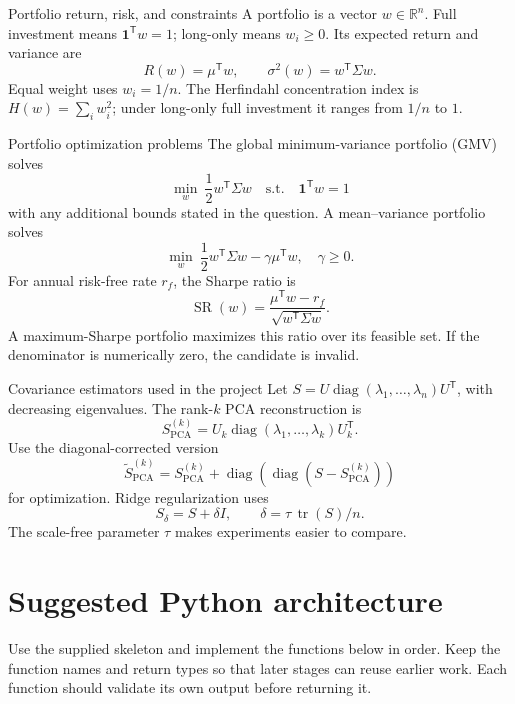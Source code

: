 \documentclass[10pt]{article}
\newcommand{\R}{\mathbb{R}}
\newcommand{\trans}{^{\mathsf T}}
\newcommand{\diag}{\operatorname{diag}}
\begin{document}
\begin{definitionbox}{Portfolio return, risk, and constraints}
A portfolio is a vector $w\in\R^n$. Full investment means
$\mathbf1\trans w=1$; long-only means $w_i\geq0$. Its expected return and
variance are
\[
R(w)=\mu\trans w,\qquad \sigma^2(w)=w\trans\Sigma w.
\]
Equal weight uses $w_i=1/n$. The Herfindahl concentration index is
$H(w)=\sum_iw_i^2$; under long-only full investment it ranges from $1/n$ to
$1$.
\end{definitionbox}

\begin{definitionbox}{Portfolio optimization problems}
The global minimum-variance portfolio (GMV) solves
\[
\min_w\ \frac12w\trans\Sigma w
\quad\text{s.t.}\quad \mathbf1\trans w=1
\]
with any additional bounds stated in the question. A mean--variance portfolio
solves
\[
\min_w\ \frac12w\trans\Sigma w-\gamma\mu\trans w,
\quad \gamma\geq0.
\]
For annual risk-free rate $r_f$, the Sharpe ratio is
\[
\operatorname{SR}(w)=
\frac{\mu\trans w-r_f}{\sqrt{w\trans\Sigma w}}.
\]
A maximum-Sharpe portfolio maximizes this ratio over its feasible set. If the
denominator is numerically zero, the candidate is invalid.
\end{definitionbox}

\begin{definitionbox}{Covariance estimators used in the project}
Let $S=U\diag(\lambda_1,\ldots,\lambda_n)U\trans$, with decreasing
eigenvalues. The rank-$k$ PCA reconstruction is
\[
S_{\mathrm{PCA}}^{(k)}=U_k\diag(\lambda_1,\ldots,\lambda_k)U_k\trans.
\]
Use the diagonal-corrected version
\[
\widetilde S_{\mathrm{PCA}}^{(k)}=S_{\mathrm{PCA}}^{(k)}+
\diag\!\left(\diag(S-S_{\mathrm{PCA}}^{(k)})\right)
\]
for optimization. Ridge regularization uses
\[
S_\delta=S+\delta I,
\qquad \delta=\tau\,\operatorname{tr}(S)/n.
\]
The scale-free parameter $\tau$ makes experiments easier to compare.
\end{definitionbox}

\section{Suggested Python architecture}

Use the supplied skeleton and implement the functions below in order. Keep the
function names and return types so that later stages can reuse earlier work.
Each function should validate its own output before returning it.
\end{document}
